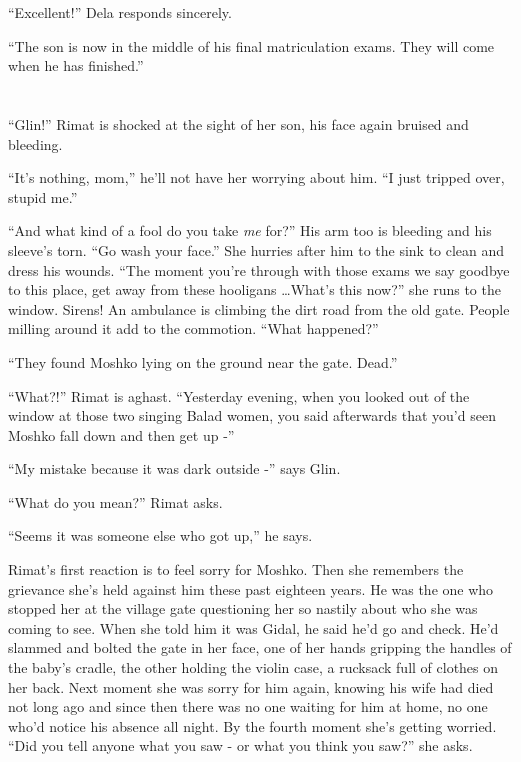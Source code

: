 \documentclass[twoside,11pt]{book}
\begin{document}
``Excellent!'' Dela responds sincerely.

``The son is now in the middle of his final matriculation exams. They will come when he has finished.''


\bigskip

\chapter{}

``Glin!'' Rimat is shocked at the sight of her son, his face again bruised and bleeding.

``It's nothing, mom,'' he'll not have her worrying about him. ``I just tripped over, stupid
me.''

``And what kind of a fool do you take \textit{me} for?'' His arm too is bleeding and his
sleeve's torn. ``Go wash your face.'' She hurries after him to the sink to clean and dress
his wounds. ``The moment you're through with those exams we say goodbye to this place, get away from these
hooligans {\dots}What's this now?'' she runs to the window. Sirens! An ambulance is climbing the dirt road
from the old gate. People milling around it add to the commotion. ``What happened?''

``They found Moshko lying on the ground near the gate. Dead.''

``What?!'' Rimat is aghast. ``Yesterday evening, when you looked
out of the window at those two singing Balad women, you said afterwards that you'd seen Moshko fall down and then get
up -''

``My mistake because it was dark outside -'' says Glin.

``What do you mean?'' Rimat asks.

``Seems it was someone else who got up,'' he says.

Rimat's first reaction is to feel sorry for Moshko. Then she remembers the grievance she's held against him these
past eighteen years. He was the one who stopped her at the village gate questioning her so nastily
about who she was coming to see. When she told him it was Gidal, he said he'd go and check. He'd slammed and bolted the
gate in her face, one of her hands gripping the handles of the baby's cradle, the other holding the violin case, a
rucksack full of clothes on her back. Next moment she was sorry for him again, knowing his wife had died not long ago
and since then there was no one waiting for him at home, no one who'd notice his absence all night. By the fourth
moment she's getting worried. ``Did you tell anyone what you saw - or what you think you
saw?'' she asks.
\end{document}
